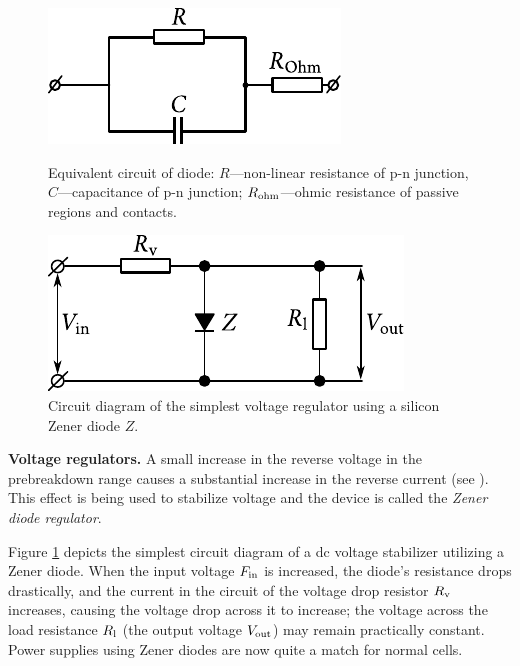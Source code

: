 \begin{figure}[!t]
	\begin{minipage}[t]{0.48\linewidth}
		\begin{center}
            \includegraphics[scale=0.98]{figures/ch_08/fig_8_19.pdf}
            \caption[]{Equivalent circuit of diode: $R$---non-linear resistance of p-n junction, $C$---capacitance of p-n junction; $R_{\text{ohm}}$---ohmic resistance of passive regions and contacts.}
            \label{fig:8_19}
		\end{center}
	\end{minipage}
	\hfill{ }%
	\begin{minipage}[t]{0.48\linewidth}
		\begin{center}
			\includegraphics[scale=0.98]{figures/ch_08/fig_8_20.pdf}
			\caption[]{Circuit diagram of the simplest voltage regulator using a silicon Zener diode $Z$.}
			\label{fig:8_20}
		\end{center}
	\end{minipage}
\vspace{-0.3cm}
\end{figure}

\textbf{Voltage regulators.} A small increase in the reverse voltage in the prebreakdown range causes a substantial increase in the reverse current (see ). This effect is being used to stabilize voltage and the device is called the \textit{Zener diode regulator}.

Figure \ref{fig:8_20} depicts the simplest circuit diagram of a dc voltage stabilizer utilizing a Zener diode. When the input voltage $F_{\text{in}}$ is increased, the diode's resistance drops drastically, and the current in the circuit of the voltage drop resistor $R_{\text{v}}$ increases, causing the voltage drop across it to increase; the voltage across the load resistance $R_{\text{l}}$ (the output voltage $V_{\text{out}}$) may remain practically constant. Power supplies using Zener diodes are now quite a match for normal cells.

